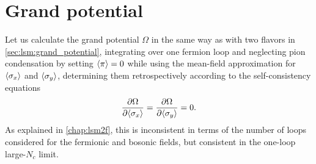 \section{Grand potential}

Let us calculate the grand potential $\Omega$ in the same way as with two flavors in \cref{sec:lsm:grand_potential},
integrating over one fermion loop and
neglecting pion condensation by setting $\langle \pi \rangle=0$
while using the mean-field approximation for $\langle \sigma_x \rangle$ and $\langle \sigma_y \rangle$,
determining them retrospectively according to the self-consistency equations
\begin{equation}
	\pdv{\Omega}{ \langle \sigma_x \rangle} =
	\pdv{\Omega}{ \langle \sigma_y \rangle} = 0.
\end{equation}
As explained in \cref{chap:lsm2f},
this is inconsistent in terms of the number of loops considered for the fermionic and bosonic fields,
but consistent in the one-loop large-$N_c$ limit.

